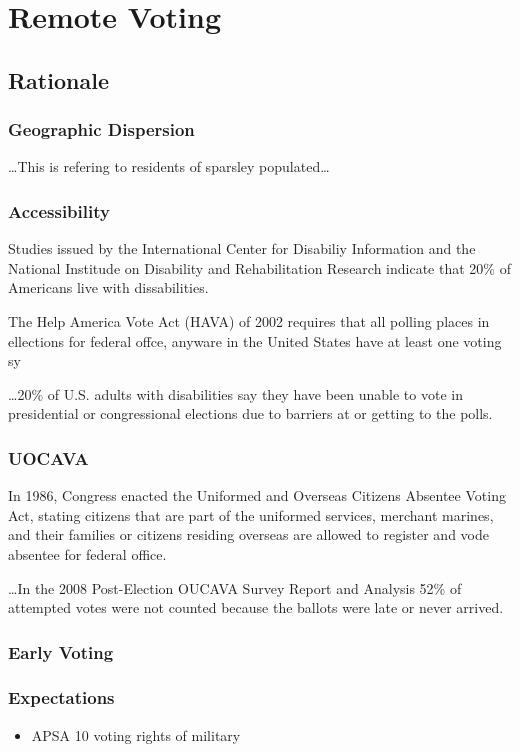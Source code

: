 \chapter{Remote Voting}
\label{chapter:remote_voting}

\section{Rationale}
\subsection{Geographic Dispersion}
\ldots This is refering to residents of sparsley populated\ldots
\subsection{Accessibility}
Studies issued by the International Center for Disabiliy Information and the National Institude on Disability and Rehabilitation Research indicate that 20\% of Americans live with dissabilities. 

The Help America Vote Act (HAVA) of 2002 requires that all polling places in ellections for federal offce, anyware in the United States have at least one voting sy

\ldots 20\% of U.S. adults with disabilities say they have been unable to vote in presidential or congressional elections due to barriers at or getting to the polls.
\subsection{UOCAVA}
In 1986, Congress enacted the Uniformed and Overseas Citizens Absentee Voting Act, stating citizens that are part of the uniformed services, merchant marines, and their families or citizens residing overseas are allowed to register and vode absentee for federal office. 

\ldots In the 2008 Post-Election OUCAVA Survey Report and Analysis 52\% of attempted votes were not counted because the ballots were late or never arrived.
\subsection{Early Voting}
\subsection{Expectations}
\begin{itemize}
\item APSA 10 voting rights of military
\end{itemize}

